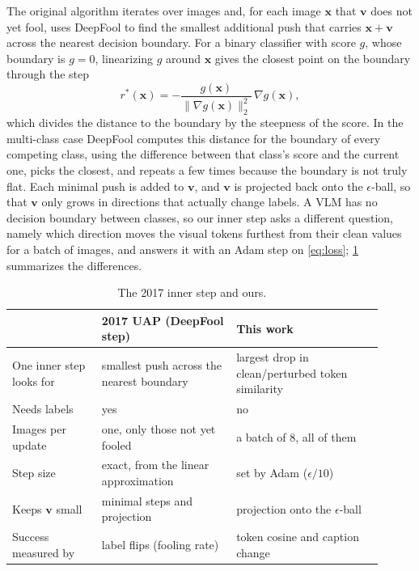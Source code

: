 \documentclass[10pt,twocolumn,letterpaper]{article}
\newcommand{\vv}{\boldsymbol{v}}
\newcommand{\xx}{\boldsymbol{x}}
\begin{document}
The original algorithm \cite{moosavi2017universal} iterates over images and, for each image $\xx$ that $\vv$ does not yet fool, uses DeepFool to find the smallest additional push that carries $\xx+\vv$ across the nearest decision boundary. For a binary classifier with score $g$, whose boundary is $g=0$, linearizing $g$ around $\xx$ gives the closest point on the boundary through the step
\begin{equation}
r^*(\xx) = -\frac{g(\xx)}{\|\nabla g(\xx)\|_2^2}\,\nabla g(\xx),
\end{equation}
which divides the distance to the boundary by the steepness of the score. In the multi-class case DeepFool computes this distance for the boundary of every competing class, using the difference between that class's score and the current one, picks the closest, and repeats a few times because the boundary is not truly flat. Each minimal push is added to $\vv$, and $\vv$ is projected back onto the $\epsilon$-ball, so that $\vv$ only grows in directions that actually change labels. A VLM has no decision boundary between classes, so our inner step asks a different question, namely which direction moves the visual tokens furthest from their clean values for a batch of images, and answers it with an Adam step on \cref{eq:loss}; \cref{tab:algo} summarizes the differences.

\begin{table}[h]
\centering
\small
\begin{tabular}{@{}>{\raggedright}p{0.22\linewidth}>{\raggedright}p{0.33\linewidth}>{\raggedright\arraybackslash}p{0.36\linewidth}@{}}
\toprule
 & 2017 UAP (DeepFool step) & This work \\
\midrule
One inner step looks for & smallest push across the nearest boundary & largest drop in clean/perturbed token similarity \\
Needs labels & yes & no \\
Images per update & one, only those not yet fooled & a batch of 8, all of them \\
Step size & exact, from the linear approximation & set by Adam ($\epsilon/10$) \\
Keeps $\vv$ small & minimal steps and projection & projection onto the $\epsilon$-ball \\
Success measured by & label flips (fooling rate) & token cosine and caption change \\
\bottomrule
\end{tabular}
\caption{The 2017 inner step and ours.}
\label{tab:algo}
\end{table}
\end{document}

